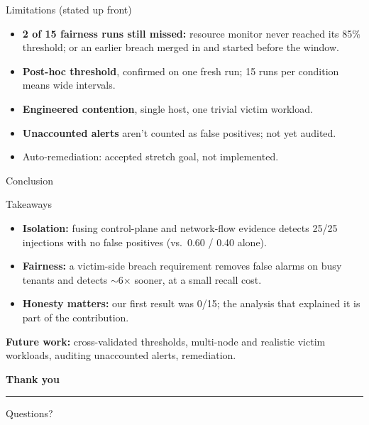 \documentclass[aspectratio=169,11pt]{beamer}
\begin{document}
\begin{frame}{Limitations (stated up front)}
\begin{itemize}
\item \textbf{2 of 15 fairness runs still missed:} resource monitor never reached its 85\% threshold; or an earlier breach merged in and started before the window.
\item \textbf{Post-hoc threshold}, confirmed on one fresh run; 15 runs per condition means wide intervals.
\item \textbf{Engineered contention}, single host, one trivial victim workload.
\item \textbf{Unaccounted alerts} aren't counted as false positives; not yet audited.
\item Auto-remediation: accepted stretch goal, \alert{not implemented}.
\end{itemize}
\end{frame}

\begin{frame}{Conclusion}
\begin{block}{Takeaways}
\begin{itemize}
\item \textbf{Isolation:} fusing control-plane and network-flow evidence detects \alert{25/25} injections with no false positives (vs.\ 0.60 / 0.40 alone).
\item \textbf{Fairness:} a victim-side breach requirement removes false alarms on busy tenants and detects \alert{$\sim$6$\times$} sooner, at a small recall cost.
\item \textbf{Honesty matters:} our first result was 0/15; the analysis that explained it is part of the contribution.
\end{itemize}
\end{block}
\textbf{Future work:} cross-validated thresholds, multi-node and realistic victim workloads, auditing unaccounted alerts, remediation.
\end{frame}

\begin{frame}[plain]
\vfill\centering
{\color{navy}\Huge\bfseries Thank you}\par\vspace{4mm}
{\color{teal}\rule{0.3\textwidth}{1.5pt}}\par\vspace{4mm}
\large Questions?\par\vfill
\end{frame}
\end{document}
